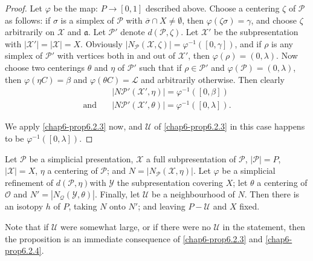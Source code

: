 \begin{proof}
Let $\varphi$ be the map: $P\to [0,1]$ described above. Choose a centering $\zeta$ of $\mathscr{P}$ as follows: if $\sigma$ is a simplex of $\mathscr{P}$ with   $\overline{\sigma}\cap X\neq \emptyset$, then $\varphi(\zeta\sigma)=\gamma$, and choose $\zeta$ arbitrarily on $\mathscr{X}$ and $\mathfrak{a}$. Let $\mathscr{P}'$ denote $d(\mathscr{P},\zeta)$. Let $\mathscr{X}'$ be the subpresentation with $|\mathscr{X}'|=|\mathscr{X}|=X$. Obviously $|N_{\mathscr{P}}(\mathscr{X},\zeta)|=\varphi^{-1}([0,\gamma])$, and if $\rho$ is any simplex of $\mathscr{P}'$ with vertices both in and out of $\mathscr{X}'$, then $\varphi(\rho)=(0,\lambda)$. Now choose two centerings $\theta$ and $\eta$ of $\mathscr{P}'$ such that if $\rho\in\mathscr{P}'$ and $\varphi(\mathscr{P})=(0,\lambda)$, then $\varphi(\eta C)=\beta$ and $\varphi(\theta C)=\mathcal{L}$ and arbitrarily otherwise. Then clearly
\begin{align*}
& |N\mathscr{P}'(\mathscr{X}',\eta)|=\varphi^{-1}([0,\beta])\\
\text{and}\quad &|N\mathscr{P}'(\mathscr{X}',\theta)|=\varphi^{-1}([0,\lambda]).
\end{align*}

We apply \ref{chap6-prop6.2.3} now, and $\mathscr{U}$ of \ref{chap6-prop6.2.3} in this case happens to be $\varphi^{-1}([0,\lambda])$.
\end{proof}

\begin{proposition}\label{chap6-prop6.2.5}
Let $\mathscr{P}$ be a simplicial presentation, $\mathscr{X}$ a full subpresentation of $\mathscr{P}$, $|\mathscr{P}|=P$, $|\mathscr{X}|=X$, $\eta$ a centering of $\mathscr{P}$; and $N=|N_{\mathscr{P}}(\mathscr{X},\eta)|$. Let $\varphi$ be a simplicial refinement of $d(\mathscr{P},\eta)$\pageoriginale with $\mathscr{Y}$ the subpresentation covering $X$; let $\theta$ a centering of $\mathscr{O}$ and $N'=|N_{\mathcal{Q}}(\mathscr{Y},\theta)|$. Finally, let $\mathscr{U}$ be a neighbourhood of $N$. Then there is an isotopy $h$ of $P$, taking $N$ onto $N'$; and leaving $P-\mathscr{U}$ and $X$ fixed.
\end{proposition}

\begin{remark*}
Note that if $\mathscr{U}$ were somewhat large, or if there were no $\mathcal{U}$ in the statement, then the proposition is an immediate consequence of \ref{chap6-prop6.2.3} and \ref{chap6-prop6.2.4}.
\end{remark*}

